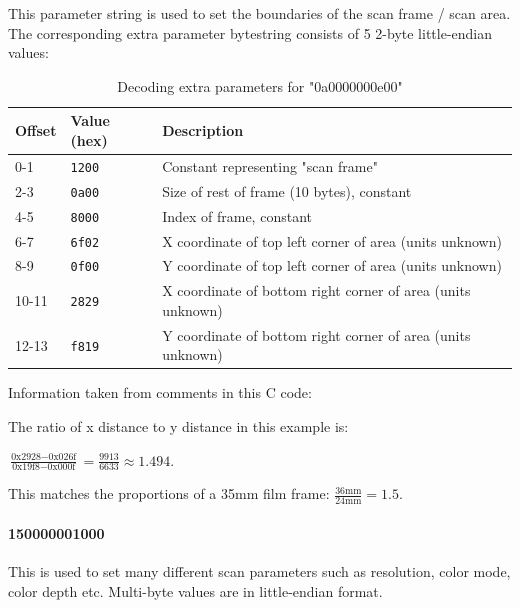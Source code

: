 \documentclass{article}
\begin{document}
This parameter string is used to set the boundaries of the scan
frame / scan area. The corresponding extra parameter bytestring
consists of 5 2-byte little-endian values:

\begin{table}[H]
  \caption{Decoding extra parameters for "0a0000000e00"}
  \centering
  \begin{tabular}{p{1cm} | p{1cm} | p{7cm}}
    Offset & Value (hex) & Description \\ \hline
    0-1 & {\tt 1200} & Constant representing "scan frame" \\
    2-3 & {\tt 0a00} & Size of rest of frame (10 bytes), constant \\
    4-5 & {\tt 8000} & Index of frame, constant \\
    6-7 & {\tt 6f02} & X coordinate of top left corner of area (units unknown) \\
    8-9 & {\tt 0f00} & Y coordinate of top left corner of area (units unknown) \\
    10-11 & {\tt 2829} & X coordinate of bottom right corner of area (units unknown) \\
    12-13 & {\tt f819} & Y coordinate of bottom right corner of area (units unknown) \\
  \end{tabular}
  
  \vspace{5mm}
  Information taken from comments in this C code: \cite[\texttt{pieusb\_scancmd.c}]{sane_code}
  \label{table:param0a}
\end{table}

The ratio of x distance to y distance in this example is:

$\frac{\textrm{0x2928} - \textrm{0x026f}}{\textrm{0x19f8} - \textrm{0x000f}} = \frac{9913}{6633} \approx 1.494$.

This matches the proportions of a 35mm film frame: $\frac{36 \textrm{mm}}{24 \textrm{mm}} = 1.5$.

\paragraph{150000001000} This is used to set many different scan parameters
such as resolution, color mode, color depth etc. Multi-byte
values are in little-endian format.
\end{document}
